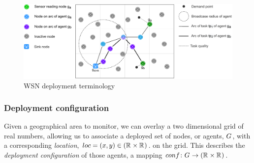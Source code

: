 \newcommand{\varLocation}[2]{\varSymbol{loc}{#1}{#2}}
\newcommand{\setLocation}[2]{\setSymbol{LOC}{#1}{#2}}
\newcommand{\formalVarLocation}[2]{(x,y)}
\newcommand{\formalSetLocation}[2]{(\setRealNumbers{}{} \times \setRealNumbers{}{})}

\newcommand{\functionDeployment}[2]{\functionSignature{conf}{\setAgents{}{}}}
\newcommand{\formalDeployment}[2]{\functionFormal{conf}{\setAgents{}{}}{(\setRealNumbers{}{} \times \setRealNumbers{}{})}}
\newcommand{\functionTaskArc}[2]{\functionSignature{arc}{\varAtomicTask{}{}}}
\newcommand{\formalTaskArc}[2]{\functionFormal{arc}{\setAtomicTask{}{}}{\powerSetAgents{}{}}}
\newcommand{\functionTaskDemandPoint}[2]{\functionSignature{dp}{\varAtomicTask{}{}}}
\newcommand{\formalTaskDemandPoint}[2]{\functionFormal{dp}{\setAtomicTask{}{}}{(\setRealNumbersNonNegative{}{} \times \setRealNumbersNonNegative)}}
\newcommand{\varActiveAgent}[2]{\varAgent{#1}{\oplus}}
\newcommand{\varInactiveAgent}[2]{\varAgent{#1}{\ominus}}
\newcommand{\varSensingAgent}[2]{\varAgent{#1}{\ast}}
\newcommand{\varSinkAgent}[2]{\varAgent{#1}{\Delta}}

\newcommand{\varEnergy}[2]{\varSymbol{e}{#1}{#2}}
\newcommand{\setEnergy}[2]{\setSymbol{E}{#1}{#2}}



\begin{figure}
\centering 
\includegraphics[width=0.9\linewidth]{grid_concept}
\caption[WSN deployment terminology]{WSN deployment terminology}
\label{fig:gridconcept}
\end{figure}

\subsubsection*{Deployment configuration}
Given a geographical area to monitor, we can overlay a two dimensional grid of real numbers, allowing us to associate a deployed set of nodes, or agents, $G_{}^{}$, with a corresponding \textit{location}, $\varLocation{}{} = \formalVarLocation{}{} \in \formalSetLocation{}{}$. on the grid. This describes the \textit{deployment configuration} of those agents, a mapping $\formalDeployment{}{}$.


